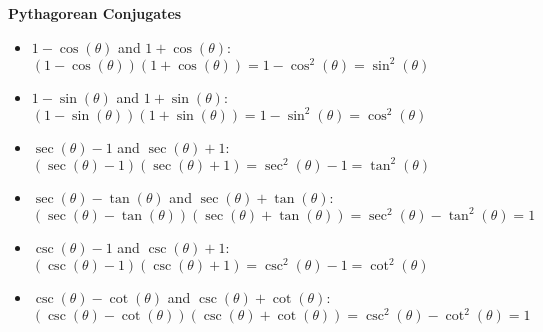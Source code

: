 \documentclass{ximera}
\begin{document}
\begin{callout}
\centerline{\textbf{Pythagorean Conjugates}}  

\begin{itemize}

\item $1 - \cos(\theta)$ and  $1+\cos(\theta)$:\\  $(1-\cos(\theta))(1+\cos(\theta)) = 1 - \cos^{2}(\theta) = \sin^{2}(\theta)$

\item  $1-\sin(\theta)$ and $1 + \sin(\theta)$: \\ $(1-\sin(\theta))(1+\sin(\theta)) = 1 - \sin^{2}(\theta) = \cos^{2}(\theta)$

\item  $\sec(\theta)-1$ and $\sec(\theta)+1$: \\ $(\sec(\theta)-1)(\sec(\theta)+1) = \sec^{2}(\theta) - 1 =  \tan^{2}(\theta)$

\item  $\sec(\theta)-\tan(\theta)$ and $\sec(\theta)+\tan(\theta)$: \\ $(\sec(\theta)-\tan(\theta))(\sec(\theta)+\tan(\theta)) = \sec^{2}(\theta) - \tan^{2}(\theta) = 1$

\item  $\csc(\theta)-1$ and $\csc(\theta)+1$:\\  $(\csc(\theta)-1)(\csc(\theta)+1) = \csc^{2}(\theta) - 1 =  \cot^{2}(\theta)$

\item  $\csc(\theta)-\cot(\theta)$ and $\csc(\theta)+\cot(\theta)$:\\  $(\csc(\theta)-\cot(\theta))(\csc(\theta)+\cot(\theta)) = \csc^{2}(\theta) - \cot^{2}(\theta) = 1$

\smallskip

\end{itemize}
\end{callout}
\end{document}
